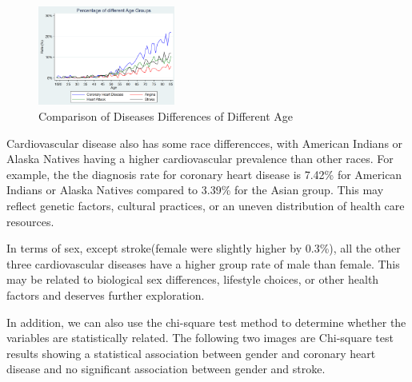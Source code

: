 \documentclass{article}
\begin{document}
\begin{figure}[!h]
	\centering
	\includegraphics[width=0.4\textwidth]{../Image/Graph04.png}
	\caption{Comparison of Diseases Differences of Different Age}
	\label{fig:G4}
\end{figure}

Cardiovascular disease also has some race differencces, with American Indians or Alaska Natives having a higher cardiovascular prevalence than other races. For example, the the diagnosis rate for coronary heart disease is 7.42\% for American Indians or Alaska Natives compared to 3.39\% for the Asian group. This may reflect genetic factors, cultural practices, or an uneven distribution of health care resources. 

In terms of sex, except stroke(female were slightly higher by 0.3\%), all the other three cardiovascular diseases have a higher group rate of male than female. This may be related to biological sex differences, lifestyle choices, or other health factors and deserves further exploration.

In addition, we can also use the chi-square test method to determine whether the variables are statistically related. The following two images are Chi-square test results showing a statistical association between gender and coronary heart disease and no significant association between gender and stroke.
\end{document}
